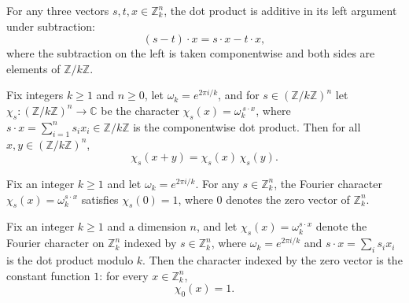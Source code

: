 \begin{lemma}
\label{ZkFourier.zkDot_sub}
\leanok
{}
For any three vectors $s, t, x \in \mathbb{Z}_k^n$, the dot product is additive in its
left argument under subtraction:
\[
(s - t) \cdot x = s \cdot x - t \cdot x,
\]
where the subtraction on the left is taken componentwise and both sides are elements of
$\mathbb{Z}/k\mathbb{Z}$.
\end{lemma}

\begin{lemma}
\label{ZkFourier.char_s_add}
\leanok
{}
Fix integers $k \ge 1$ and $n \ge 0$, let $\omega_k = e^{2\pi i/k}$, and for $s \in
(\mathbb{Z}/k\mathbb{Z})^n$ let $\chi_s : (\mathbb{Z}/k\mathbb{Z})^n \to \mathbb{C}$ be
the character $\chi_s(x) = \omega_k^{\,s\cdot x}$, where $s\cdot x = \sum_{i=1}^{n} s_i
x_i \in \mathbb{Z}/k\mathbb{Z}$ is the componentwise dot product. Then for all $x, y \in
(\mathbb{Z}/k\mathbb{Z})^n$,
\[
\chi_s(x + y) = \chi_s(x)\,\chi_s(y).
\]
\end{lemma}

\begin{lemma}
\label{ZkFourier.char_s_zero_vec}
\leanok
{}
Fix an integer $k \ge 1$ and let $\omega_k = e^{2\pi i/k}$. For any $s \in
\mathbb{Z}_k^n$, the Fourier character $\chi_s(x) = \omega_k^{s \cdot x}$ satisfies
$\chi_s(0) = 1$, where $0$ denotes the zero vector of $\mathbb{Z}_k^n$.
\end{lemma}

\begin{lemma}
\label{ZkFourier.char_s_zero_index}
\leanok
{}
Fix an integer $k \ge 1$ and a dimension $n$, and let $\chi_s(x) = \omega_k^{s \cdot x}$
denote the Fourier character on $\mathbb{Z}_k^n$ indexed by $s \in \mathbb{Z}_k^n$,
where $\omega_k = e^{2\pi i/k}$ and $s \cdot x = \sum_{i} s_i x_i$ is the dot product
modulo $k$. Then the character indexed by the zero vector is the constant function $1$:
for every $x \in \mathbb{Z}_k^n$, \[ \chi_0(x) = 1. \]
\end{lemma}

